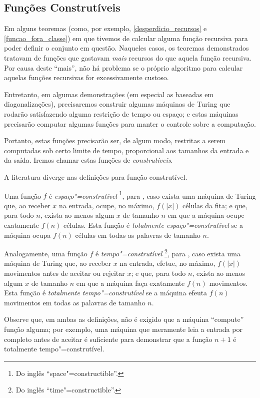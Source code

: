 \subsection{Funções Construtíveis}

Em alguns teoremas
(como, por exemplo, \ref{desperdicio_recursos} e \ref{funcao_fora_classe})
em que tivemos de calcular alguma função recursiva
para poder definir o conjunto em questão.
Naqueles casos,
os teoremas demonstrados tratavam de funções
que gastavam \emph{mais} recursos do que aquela função recursiva.
Por causa deste ``mais'',
não há problema
se o próprio algoritmo para calcular aquelas funções recursivas
for excessivamente custoso.

Entretanto,
em algumas demonstrações
(em especial as baseadas em diagonalizações),
precisaremos construir algumas máquinas de Turing
que rodarão satisfazendo alguma restrição de tempo ou espaço;
e estas máquinas precisarão computar algumas funções
para manter o controle sobre a computação.

Portanto,
estas funções precisarão ser,
de algum modo,
restritas a serem computadas sob certo limite de tempo,
proporcional aos tamanhos da entrada e da saída.
Iremos chamar estas funções de \emph{construtíveis}.

A literatura diverge nas definições para função construtível.

Uma função $f$ é \emph{espaço"=construtível}
\footnote{
    Do inglês ``space"=constructible''.
}, para
,
caso exista uma máquina de Turing que,
ao receber $x$ na entrada,
ocupe, no máximo, $f(|x|)$ células da fita;
e que, para todo $n$, exista ao menos algum $x$ de tamanho $n$
em que a máquina ocupe exatamente $f(n)$ células.
Esta função é \emph{totalmente espaço"=construtível}
se a máquina ocupa $f(n)$ células em todas as palavras de tamanho $n$.

Analogamente, uma função $f$ é \emph{tempo"=construtível}
\footnote{
    Do inglês ``time"=constructible''.
}, para
,
caso exista uma máquina de Turing que,
ao receber $x$ na entrada,
efetue, no máximo, $f(|x|)$ movimentos antes de aceitar ou rejeitar $x$;
e que, para todo $n$, exista ao menos algum $x$ de tamanho $n$
em que a máquina faça exatamente $f(n)$ movimentos.
Esta função é \emph{totalmente tempo"=construtível}
se a máquina efeuta $f(n)$ movimentos em todas as palavras de tamanho $n$.

Observe que,
em ambas as definições,
não é exigido que a máquina ``compute'' função alguma;
por exemplo,
uma máquina que meramente leia a entrada por completo antes de aceitar
é suficiente para demonstrar que a função $n+1$
é totalmente tempo"=construtível.
